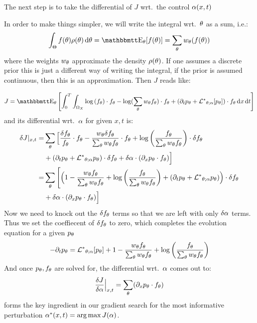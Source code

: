 \documentclass{article}
\begin{document}
The next step is to take the differential of $J$ wrt.\ the control
${\alpha}(x,t)$


In order to make things simpler, we will write the integral wrt.\
${\theta}$ as a sum, i.e.:
$$
\int_\Theta f(\th) \rho(\th) \intd{\th} = \Exp_\th [f(\th) ] = 
\sum_\th w_\th (f(\th))
$$ where the weights $w_{\theta}$ approximate the density $\rho({\theta})$.
If one assumes a discrete prior this is just a different way of writing the
integral, if the prior is assumed continuous, then this is an approximation.
Then $J$ reads like:

$$
J =  \Exp_\th
\left[ \int_0^T\int_{\O_X} \log\left(f_\th\right)\cdot \ft - 
\log(\sum_\th \wt \ft) \cdot f_\th 
 			 + 
 			 (\di_t p_\th + \Lstar_{\th;\a} [p_\th] ) \cdot f_\th
\intd{x}
\intd{t} \right]
$$
and its differential wrt.\ ${\alpha}$ for given $x,t$ is:
\begin{align*}
\delta J|_{x,t} =& \sum_{\theta} \Big[
\frac{{ \delta f_{\theta}}}{{ f_{\theta}}} \cdot { f_{\theta}} - \frac{  w_{\theta} { \delta f_{\theta}} }{\sum_{\theta} w_{\theta}{ f_{\theta}}}\cdot { f_{\theta}} 
+ \log\left(\frac{f_{\theta}} {\sum_{\theta} { w_{\theta} } { f_{\theta}} }\right) \cdot { \delta f_{\theta}}  
\\&
+  ({\partial}_t p_{\theta} + { { \mathcal{L} }^* }_{{\theta};{\alpha}} p_{\theta} ) \cdot { \delta f_{\theta}}
+ \delta {\alpha} \cdot ({\partial}_x { p_{\theta}} \cdot { f_{\theta}})
\Big]
\\
=& \sum_{\theta} \Bigg[\Big(
1 - \frac{  w_{\theta} { f_{\theta}} }{\sum_{\theta} w_{\theta}{ f_{\theta}}} 
+ \log\left(\frac{f_{\theta}} {\sum_{\theta} { w_{\theta} } { f_{\theta}} }\right)   
+  ({\partial}_t p_{\theta} + { { \mathcal{L} }^* }_{{\theta};{\alpha}} p_{\theta} )
\Big)  \cdot { \delta f_{\theta}} 
\\
&+ \delta {\alpha} \cdot ({\partial}_x { p_{\theta}} \cdot { f_{\theta}})
\Big]
\end{align*}
Now we need to knock out the ${ \delta f_{\theta}}$ terms so that we are left with only $\delta
{\alpha}$ terms. Thus we set the coeffiecent of ${ \delta f_{\theta}}$ to zero, which completes the 
evolution equation for a given $p_{\theta}$
\begin{equation}
-{\partial}_t { p_{\theta}} = 
{ { \mathcal{L} }^* }_{{\theta};{\alpha}} [p_{\theta}] +  
1 - \frac{  w_{\theta} { f_{\theta}} }{\sum_{\theta} w_{\theta}{ f_{\theta}}} 
+ \log\left(\frac{f_{\theta}} {\sum_{\theta} { w_{\theta} } { f_{\theta}} }\right)   
\end{equation}
And once ${ p_{\theta}}, { f_{\theta}}$ are solved for, the differential wrt.\ ${\alpha}$ comes
out to:
\begin{equation}
\frac {\delta J}{\delta {\alpha}} \Big|_{x,t} = \sum_{\theta} ({\partial}_x { p_{\theta}} \cdot { f_{\theta}})
\label{eq:differential_objective_wrt_control_final}
\end{equation}
 forms the key ingredient
in our gradient search for the most informative perturbation $\a^*(x,t) =
\argmax J(\a)$.
\end{document}

